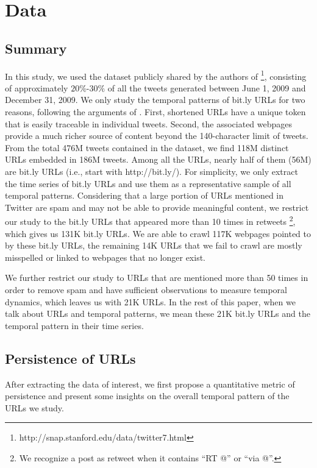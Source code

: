 \documentclass[phd,tocprelim]{cornell}
\begin{document}
\section{Data}

\subsection{Summary}
In this study, we used the dataset publicly shared by the authors of \cite{Yang-2011}\footnote{http://snap.stanford.edu/data/twitter7.html}, 
consisting of approximately $20\%$-$30\%$ of all the tweets generated between June 1, 2009 and December 31, 2009. 
We only study the temporal patterns of bit.ly URLs for two reasons, 
following the arguments of \cite{Wu-Twitter-2011}. First, 
shortened URLs have a unique token that is easily traceable in individual tweets. 
Second, the associated webpages provide a much richer source of content beyond the 140-character limit of tweets. 
From the total 476M tweets contained in the dataset, we find 118M distinct URLs embedded in 186M tweets. 
Among all the URLs, nearly half of them (56M) are bit.ly URLs (i.e., start with http://bit.ly/). 
For simplicity, we only extract the time series of bit.ly URLs and use them as a representative sample of all temporal patterns. 
Considering that a large portion of URLs mentioned in Twitter are spam and may not be able to provide meaningful content, 
we restrict our study to the bit.ly URLs that appeared more than 10 times in retweets \footnote{We recognize a post as retweet when it contains ``RT @'' or ``via @''.}, 
which gives us 131K bit.ly URLs. 
We are able to crawl 117K webpages pointed to by these bit.ly URLs, the remaining 14K URLs that we fail to crawl are mostly misspelled 
or linked to webpages that no longer exist. 

We further restrict our study to URLs that are mentioned more than 50 times in order to remove spam and have sufficient observations to measure temporal dynamics, which leaves us with 21K URLs. 
In the rest of this paper, when we talk about URLs and temporal patterns, we mean these 21K bit.ly URLs and the temporal pattern in their time series.

\subsection{Persistence of URLs}
After extracting the data of interest, we first propose a quantitative metric of persistence and present some insights on the overall temporal pattern of the URLs we study.
\end{document}
